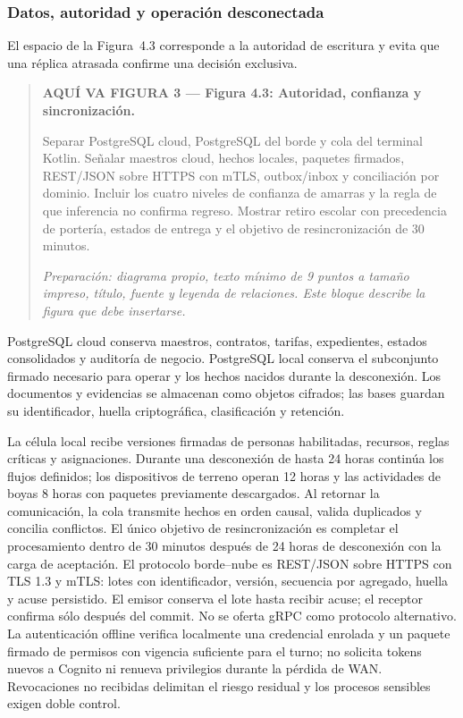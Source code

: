 \documentclass[11pt,letterpaper]{report}
\begin{document}
\subsubsection*{Datos, autoridad y operación desconectada}

El espacio de la Figura~4.3 corresponde a la autoridad de escritura y evita que una réplica atrasada confirme una decisión exclusiva.
\par\medskip
\begin{quote}\textbf{AQUÍ VA FIGURA 3 — Figura 4.3: Autoridad, confianza y sincronización.}\par Separar PostgreSQL cloud, PostgreSQL del borde y cola del terminal Kotlin. Señalar maestros cloud, hechos locales, paquetes firmados, REST/JSON sobre HTTPS con mTLS, outbox/inbox y conciliación por dominio. Incluir los cuatro niveles de confianza de amarras y la regla de que inferencia no confirma regreso. Mostrar retiro escolar con precedencia de portería, estados de entrega y el objetivo de resincronización de 30 minutos.\par\textit{Preparación: diagrama propio, texto mínimo de 9 puntos a tamaño impreso, título, fuente y leyenda de relaciones. Este bloque describe la figura que debe insertarse.}\end{quote}
\par\medskip

PostgreSQL cloud conserva maestros, contratos, tarifas, expedientes, estados consolidados y auditoría de negocio. PostgreSQL local conserva el subconjunto firmado necesario para operar y los hechos nacidos durante la desconexión. Los documentos y evidencias se almacenan como objetos cifrados; las bases guardan su identificador, huella criptográfica, clasificación y retención.

La célula local recibe versiones firmadas de personas habilitadas, recursos, reglas críticas y asignaciones. Durante una desconexión de hasta 24 horas continúa los flujos definidos; los dispositivos de terreno operan 12 horas y las actividades de boyas 8 horas con paquetes previamente descargados. Al retornar la comunicación, la cola transmite hechos en orden causal, valida duplicados y concilia conflictos. El único objetivo de resincronización es completar el procesamiento dentro de 30 minutos después de 24 horas de desconexión con la carga de aceptación. El protocolo borde--nube es REST/JSON sobre HTTPS con TLS 1.3 y mTLS: lotes con identificador, versión, secuencia por agregado, huella y acuse persistido. El emisor conserva el lote hasta recibir acuse; el receptor confirma sólo después del commit. No se oferta gRPC como protocolo alternativo. La autenticación offline verifica localmente una credencial enrolada y un paquete firmado de permisos con vigencia suficiente para el turno; no solicita tokens nuevos a Cognito ni renueva privilegios durante la pérdida de WAN. Revocaciones no recibidas delimitan el riesgo residual y los procesos sensibles exigen doble control.
\end{document}
